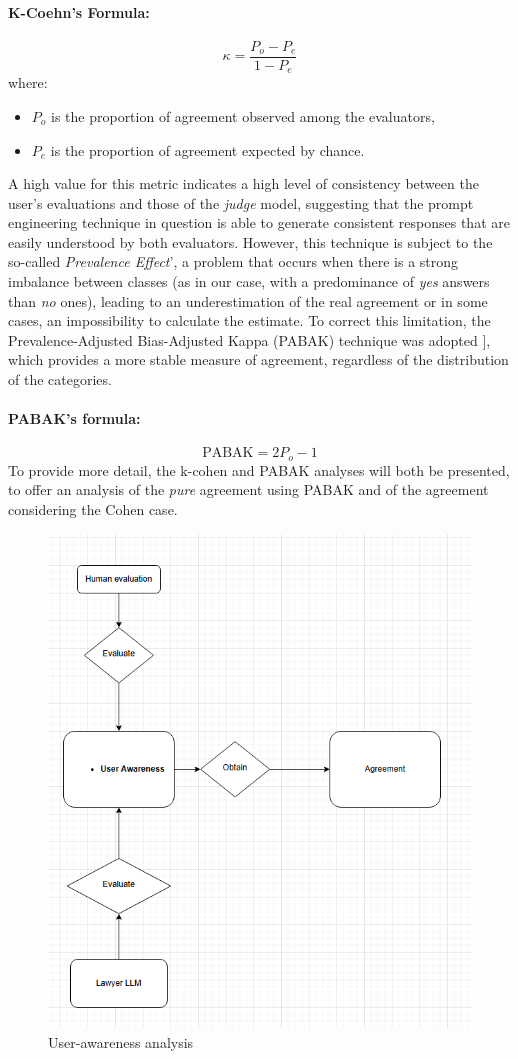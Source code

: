 \paragraph{K-Coehn's Formula:} 
\[
\kappa = \frac{P_o - P_e}{1 - P_e}
\]
where:
\begin{itemize}
    \item \(P_o\) is the proportion of agreement observed among the evaluators,
    \item \(P_e\) is the proportion of agreement expected by chance.
\end{itemize}
A high value for this metric indicates a high level of consistency between the user's evaluations and those of the \textit{judge} model, suggesting that the prompt engineering technique in question is able to generate consistent responses that are easily understood by both evaluators.
However, this technique is subject to the so-called \textit{Prevalence Effect}’, a problem that occurs when there is a strong imbalance between classes (as in our case, with a predominance of \textit{yes} answers than \textit{no} ones), leading to an underestimation of the real agreement \cite{ricci2020sperimentazione} or in some cases, an impossibility to calculate the estimate.
To correct this limitation, the Prevalence-Adjusted Bias-Adjusted Kappa (PABAK) technique was adopted ], which provides a more stable measure of agreement, regardless of the distribution of the categories.
\paragraph{PABAK's formula: }
\[
\text{PABAK} = 2P_o - 1
\]
To provide more detail, the k-cohen and PABAK analyses will both be presented, to offer an analysis of the \textit{pure} agreement using PABAK and of the agreement considering the Cohen case.
\begin{figure}[h]
    \centering
    \includegraphics[width=0.7\linewidth]{Figures/Agreement.png}
    \caption{User-awareness analysis}
    \label{fig:Agreem}
\end{figure}
